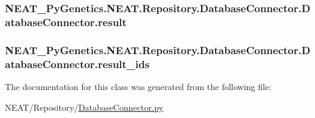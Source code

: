 \subsubsection[{\texorpdfstring{result}{result}}]{\setlength{\rightskip}{0pt plus 5cm}N\+E\+A\+T\+\_\+\+Py\+Genetics.\+N\+E\+A\+T.\+Repository.\+Database\+Connector.\+Database\+Connector.\+result\hspace{0.3cm}{\ttfamily [static]}}\hypertarget{classNEAT__PyGenetics_1_1NEAT_1_1Repository_1_1DatabaseConnector_1_1DatabaseConnector_ac4e5c7484ac4c90604a438b88250f4cc}{}\label{classNEAT__PyGenetics_1_1NEAT_1_1Repository_1_1DatabaseConnector_1_1DatabaseConnector_ac4e5c7484ac4c90604a438b88250f4cc}
\subsubsection[{\texorpdfstring{result\+\_\+ids}{result_ids}}]{\setlength{\rightskip}{0pt plus 5cm}N\+E\+A\+T\+\_\+\+Py\+Genetics.\+N\+E\+A\+T.\+Repository.\+Database\+Connector.\+Database\+Connector.\+result\+\_\+ids\hspace{0.3cm}{\ttfamily [static]}}\hypertarget{classNEAT__PyGenetics_1_1NEAT_1_1Repository_1_1DatabaseConnector_1_1DatabaseConnector_ae6a5bd1fe8b17e6f4daeb34016befacc}{}\label{classNEAT__PyGenetics_1_1NEAT_1_1Repository_1_1DatabaseConnector_1_1DatabaseConnector_ae6a5bd1fe8b17e6f4daeb34016befacc}


The documentation for this class was generated from the following file\+:\begin{DoxyCompactItemize}
\item 
N\+E\+A\+T/\+Repository/\hyperlink{DatabaseConnector_8py}{Database\+Connector.\+py}\end{DoxyCompactItemize}
